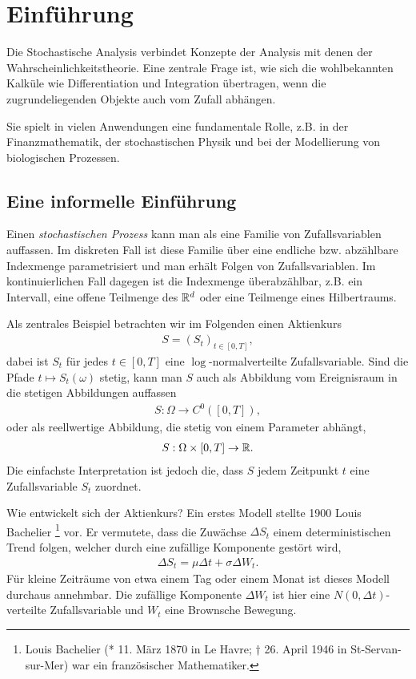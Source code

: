 \chapter{Einführung}

Die Stochastische Analysis verbindet Konzepte der Analysis mit denen der
Wahrscheinlichkeitstheorie. Eine zentrale Frage ist, wie sich die wohlbekannten
Kalküle wie Differentiation und Integration übertragen, wenn die
zugrundeliegenden Objekte auch vom Zufall abhängen.

Sie spielt in vielen Anwendungen eine fundamentale Rolle, z.B. in der
Finanzmathematik, der stochastischen Physik und bei der Modellierung von
biologischen Prozessen.

\section{Eine informelle Einführung}

Einen \emph{stochastischen Prozess} kann man als eine Familie von
Zufallsvariablen auffassen. Im diskreten Fall ist diese Familie über eine
endliche bzw. abzählbare Indexmenge parametrisiert und man erhält Folgen von
Zufallsvariablen. Im kontinuierlichen Fall dagegen ist die Indexmenge
überabzählbar, z.B. ein Intervall, eine offene Teilmenge des $\mathbb{R}^d$ oder eine
Teilmenge eines Hilbertraums.

Als zentrales Beispiel betrachten wir im Folgenden einen Aktienkurs
\begin{align*}
S = (S_t)_{t\in[0,T]},
\end{align*}
dabei ist $S_t$ für jedes $t\in[0,T]$ eine
$\log$-normalverteilte Zufallsvariable. Sind die Pfade $t\mapsto S_t(\omega)$
stetig, kann man $S$ auch als Abbildung vom Ereignisraum in die stetigen
Abbildungen auffassen
\begin{align*}
S : \Omega \to C^0([0,T]),
\end{align*}
oder als reellwertige Abbildung, die stetig von einem Parameter abhängt,
\begin{align*}
S: \Omega\times[0,T]\to \mathbb{R}.
\end{align*}
Die einfachste Interpretation ist jedoch die, dass $S$ jedem Zeitpunkt $t$ eine
Zufallsvariable $S_t$ zuordnet.

Wie entwickelt sich der Aktienkurs? Ein erstes Modell stellte 1900 Louis
Bachelier \footnote{Louis Bachelier (* 11. März 1870 in Le Havre; † 26. April 1946 in
St-Servan-sur-Mer) war ein französischer Mathematiker.} vor. Er vermutete,
dass die Zuwächse $\Delta S_t$ einem deterministischen Trend folgen, welcher
durch eine zufällige Komponente gestört wird, 
\begin{align*}
\Delta S_t = \mu \Delta t + \sigma \Delta W_t.
\end{align*}
Für kleine Zeiträume von etwa einem Tag oder einem Monat ist dieses Modell
durchaus annehmbar.
Die zufällige Komponente $\Delta W_t$ ist hier eine $N(0,\Delta t)$-verteilte
Zufallsvariable und $W_t$ eine Brownsche Bewegung.

